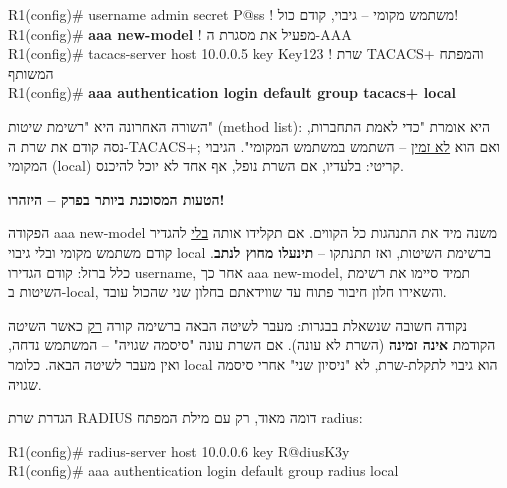 \documentclass[11pt]{article}
\newcommand{\enLR}[1]{\textenglish{#1}}
\newcommand{\code}[1]{\textenglish{\codefont #1}}
\newcommand{\boxtitle}[1]{{\bfseries\color{boxti}#1}}
\newenvironment{mistakebox}{\colorlet{boxti}{misti}\begin{mdframed}[backgroundcolor=misbg,linecolor=misfr,rightline=true,leftline=false,topline=false,bottomline=false,linewidth=2pt,innertopmargin=6pt,innerbottommargin=6pt,innerleftmargin=8pt,innerrightmargin=8pt,skipabove=6pt,skipbelow=6pt]}{\end{mdframed}}
\begin{document}
\begin{codebox}\begin{english}\codefont\footnotesize\color{cfg}\setlength{\parindent}{0pt}
R1(config)\# username admin secret P@ss        \textcolor{ccom}{\texthebrew{! משתמש מקומי – גיבוי, קודם כול!}}\\
R1(config)\# \textcolor{cbold}{\textbf{aaa new-model}}                    \textcolor{ccom}{\texthebrew{! מפעיל את מסגרת ה-\enLR{AAA}}}\\
R1(config)\# tacacs-server host 10.0.0.5 key Key123  \textcolor{ccom}{\texthebrew{! שרת \enLR{TACACS}+ והמפתח המשותף}}\\
R1(config)\# \textcolor{cbold}{\textbf{aaa authentication login default group tacacs+ local}}
\end{english}\end{codebox}

השורה האחרונה היא "רשימת שיטות" \enLR{(method list)}: היא אומרת "כדי לאמת התחברות, נסה קודם את שרת ה-\enLR{TACACS}+; ואם הוא \underline{לא זמין} – השתמש במשתמש המקומי". הגיבוי המקומי (\code{local}) קריטי: בלעדיו, אם השרת נופל, אף אחד לא יוכל להיכנס.\par

\begin{mistakebox}\boxtitle{הטעות המסוכנת ביותר בפרק – היזהרו!}\par  הפקודה \code{aaa new-model} משנה מיד את התנהגות כל הקווים. אם תקלידו אותה \underline{בלי} להגדיר קודם משתמש מקומי ובלי גיבוי \code{local} ברשימת השיטות, ואז תתנתקו – \textbf{תינעלו מחוץ לנתב}. כלל ברזל: קודם הגדירו \code{username}, אחר כך \code{aaa new-model}, תמיד סיימו את רשימת השיטות ב-\code{local}, והשאירו חלון חיבור פתוח עד שווידאתם בחלון שני שהכול עובד.\end{mistakebox}

נקודה חשובה שנשאלת בבגרות: מעבר לשיטה הבאה ברשימה קורה \underline{רק} כאשר השיטה הקודמת \textbf{אינה זמינה} (השרת לא עונה). אם השרת עונה "סיסמה שגויה" – המשתמש נדחה, ואין מעבר לשיטה הבאה. כלומר \code{local} הוא גיבוי לתקלת-שרת, לא "ניסיון שני" אחרי סיסמה שגויה.\par

הגדרת שרת \enLR{RADIUS} דומה מאוד, רק עם מילת המפתח \code{radius}:\par

\begin{codebox}\begin{english}\codefont\footnotesize\color{cfg}\setlength{\parindent}{0pt}
R1(config)\# radius-server host 10.0.0.6 key R@diusK3y\\
R1(config)\# aaa authentication login default group radius local
\end{english}\end{codebox}
\end{document}
